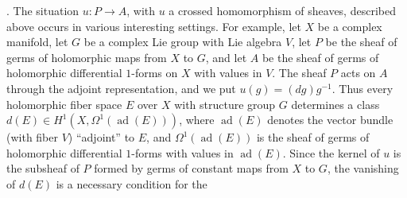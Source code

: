 . The situation $u:P\to A$, with $u$ a crossed homomorphism of
sheaves, described above occurs in various interesting settings. For example,
let $X$ be a complex manifold, let $G$ be a complex Lie group with Lie algebra
$V$, let $P$ be the sheaf of germs of holomorphic maps from $X$ to $G$, and
let $A$ be the sheaf of germs of holomorphic differential $1$-forms on $X$
with values in $V$. The sheaf $P$ acts on $A$ through the adjoint
representation, and we put
$u(g)=(dg)g^{-1}$.
Thus every holomorphic fiber space $E$ over $X$ with structure group $G$
determines
a class
$d(E)\in H^1(X,\Omega^1(\operatorname{ad}(E)))$,
where $\operatorname{ad}(E)$ denotes the vector bundle (with fiber $V$)
``adjoint'' to $E$, and $\Omega^1(\operatorname{ad}(E))$ is the sheaf of
germs of holomorphic differential $1$-forms with values in
$\operatorname{ad}(E)$.
Since the kernel of $u$ is the subsheaf of $P$ formed by germs of constant
maps from $X$ to $G$, the vanishing of $d(E)$ is a necessary condition for the

